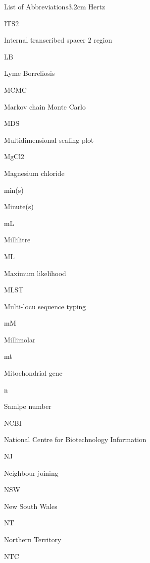 \documentclass[a4paper, nobind]{templates/ociamthesis}
\begin{document}
\begin{romanpages}
\begin{mclistof}{List of Abbreviations}{3.2cm}
Hertz

\item[ITS2]

Internal transcribed spacer 2 region

\item[LB]

Lyme Borreliosis

\item[MCMC]

Markov chain Monte Carlo

\item[MDS]

Multidimensional scaling plot

\item[MgCl2]

Magnesium chloride

\item[min(s)]

Minute(s)

\item[mL]

Millilitre

\item[ML]

Maximum likelihood

\item[MLST]

Multi-locu sequence typing

\item[mM]

Millimolar

\item[mt]

Mitochondrial gene

\item[n]

Samlpe number

\item[NCBI]

National Centre for Biotechnology Information

\item[NJ]

Neighbour joining

\item[NSW]

New South Wales

\item[NT]

Northern Territory

\item[NTC]


\end{mclistof}
\end{romanpages}
\end{document}
